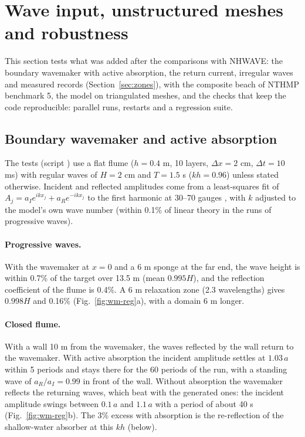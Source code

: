 \FloatBarrier
\section{Wave input, unstructured meshes and robustness}
\label{sec:ext}

This section tests what was added after the comparisons with NHWAVE: the
boundary wavemaker with active absorption, the return current, irregular
waves and measured records (Section~\ref{sec:zones}), with the composite
beach of NTHMP benchmark 5, the model on triangulated meshes, and the
checks that keep the code reproducible: parallel runs, restarts and a
regression suite.

\subsection{Boundary wavemaker and active absorption}
\label{sec:wm}

The tests (script ) use a flat flume ($h = 0.4$ m,
10 layers, $\Delta x = 2$ cm, $\Delta t = 10$ ms) with regular waves of
$H = 2$ cm and $T = 1.5$ s ($kh = 0.96$) unless stated otherwise. Incident
and reflected amplitudes come from a least-squares fit of
$A_j = a_I e^{ikx_j} + a_R e^{-ikx_j}$ to the first harmonic at 30--70
gauges \citep{zelt1992}, with $k$ adjusted to the model's own wave number
(within 0.1\% of linear theory in the runs of progressive waves).

\paragraph{Progressive waves.} With the wavemaker at $x = 0$ and a 6 m
sponge at the far end, the wave height is within 0.7\% of the target over
13.5 m (mean $0.995H$), and the reflection coefficient of the flume is
0.4\%. A 6 m relaxation zone (2.3 wavelengths) gives $0.998H$ and 0.16\%
(Fig.~\ref{fig:wm-reg}a), with a domain 6 m longer.

\paragraph{Closed flume.} With a wall 10 m from the wavemaker, the waves
reflected by the wall return to the wavemaker. With active absorption the
incident amplitude settles at $1.03\,a$ within 5 periods and stays there for
the 60 periods of the run, with a standing wave of $a_R/a_I = 0.99$ in
front of the wall. Without absorption the wavemaker reflects the returning
waves, which beat with the generated ones: the incident amplitude swings
between $0.1\,a$ and $1.1\,a$ with a period of about 40 s
(Fig.~\ref{fig:wm-reg}b). The 3\% excess with absorption is the
re-reflection of the shallow-water absorber at this $kh$ (below).

